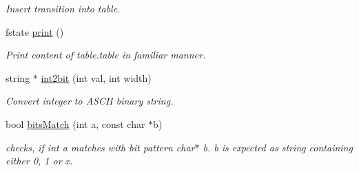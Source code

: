 \begin{DoxyCompactItemize}
\begin{DoxyCompactList}\small\item\em Insert transition into table. \end{DoxyCompactList}\item 
fstate \mbox{\hyperlink{classsmtable_a3a80d868ab18cad523c31fa44bbcd691}{print}} ()
\begin{DoxyCompactList}\small\item\em Print content of table.\+table in familiar manner. \end{DoxyCompactList}\item 
string $\ast$ \mbox{\hyperlink{classsmtable_a13b354754f6e83752c0b463c4ea7a7ee}{int2bit}} (int val, int width)
\begin{DoxyCompactList}\small\item\em Convert integer to A\+S\+C\+II binary string. \end{DoxyCompactList}\item 
bool \mbox{\hyperlink{classsmtable_a9d07557f02b4b69c5f5143fe985e242a}{bits\+Match}} (int a, const char $\ast$b)
\begin{DoxyCompactList}\small\item\em checks, if int a matches with bit pattern char$\ast$ b. b is expected as string containing either \textquotesingle{}0\textquotesingle{}, \textquotesingle{}1\textquotesingle{} or \textquotesingle{}x\textquotesingle{}. \end{DoxyCompactList}\end{DoxyCompactItemize}
